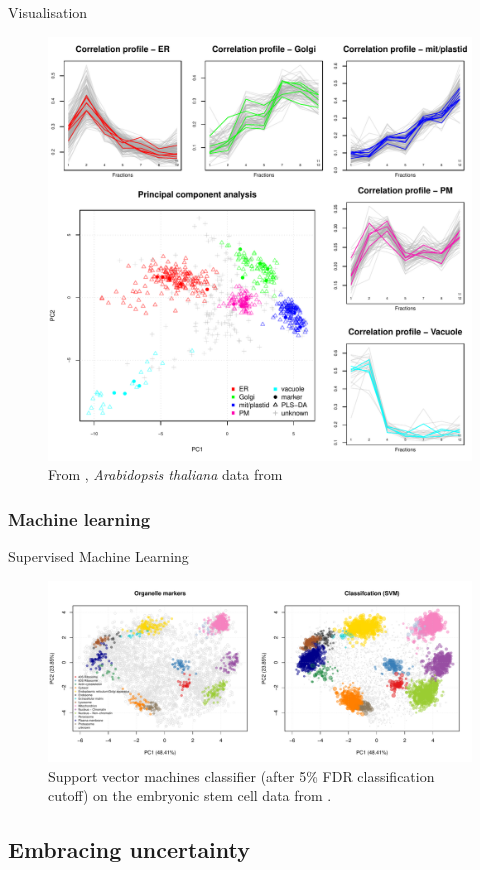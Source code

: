 \begin{frame}{Visualisation}
  \begin{figure}
    \centering
    \includegraphics[width=.6\linewidth]{figs_all/F04-analyses.pdf}
    \caption{From \cite{Gatto:2010}, \textit{Arabidopsis thaliana} data
      from \cite{Dunkley:2006}}
  \end{figure}
\end{frame}

\subsubsection*{Machine learning}
\label{sec:ml}

\begin{frame}{Supervised Machine Learning}
  \begin{figure}[h]
    \centering
    \includegraphics[width=\linewidth]{figs_all/hyperlopit-class.pdf}
    \caption{Support vector machines classifier (after 5\% FDR
      classification cutoff) on the embryonic stem cell data from
      \cite{Christoforou:2016}.}
  \end{figure}
\end{frame}


\subsection{Embracing uncertainty}

